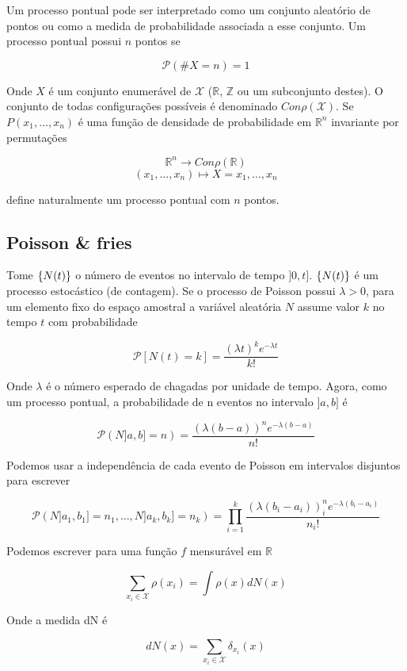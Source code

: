 Um processo pontual pode ser interpretado como um conjunto aleatório de pontos ou como a medida de probabilidade associada a esse conjunto. Um processo pontual possui $n$ pontos se

\[
\mathcal{P}(\# X=n) = 1
\]

Onde $X$ é um conjunto enumerável de $\mathcal{X}$ ($\mathbb{R}$, $\mathbb{Z}$ ou um subconjunto destes). O conjunto de todas configurações possíveis é denominado $Con\rho(\mathcal{X})$. Se $P(x_1, \dots, x_n)$ é uma função de densidade de probabilidade em $\mathbb{R}^n$ invariante por permutações

\[
	\mathbb{R}^n \rightarrow Con\rho(\mathbb{R})
\]
\[
	(x_1, \dots, x_n) \mapsto X = {x_1, \dots, x_n}
\]

define naturalmente um processo pontual com $n$ pontos.

\subsection{Poisson \& fries}

Tome $\{N(t)\}$ o número de eventos no intervalo de tempo $]0,t]$. $\{N(t)\}$  é um processo estocástico (de contagem). Se o processo de Poisson possui $\lambda > 0$, para um elemento fixo do espaço amostral a variável aleatória $N$ assume valor $k$ no tempo $t$ com probabilidade

\begin{equation}
	\mathcal{P}[N(t) = k] = \frac{(\lambda t)^k e^{-\lambda t}}{k!}
\end{equation}

Onde $\lambda$ é o número esperado de chagadas por unidade de tempo. Agora, como um processo pontual, a probabilidade de n eventos no intervalo $]a,b]$ é

\[
	\mathcal{P}(N]a,b] = n) =  \frac{(\lambda (b-a))^n e^{-\lambda (b-a)}}{n!}
\]

Podemos usar a independência de cada evento de Poisson em intervalos disjuntos para escrever

\[
	\mathcal{P}(N]a_1,b_1] = n_1, \dots, N]a_k,b_k] = n_k) = \prod_{i=1}^{k} \frac{(\lambda (b_i-a_i))^n_i e^{-\lambda (b_i-a_i)}}{n_i!}
\]

Podemos escrever para uma função $f$ mensurável em $\mathbb{R}$

\[
	\sum_{x_i \in \mathcal{X}} \rho(x_i) = \int \rho(x) dN(x)
\]

Onde a medida dN é

\[
	dN(x) = \sum_{x_i \in \mathcal{X}} \delta_{x_i} (x)
\]


